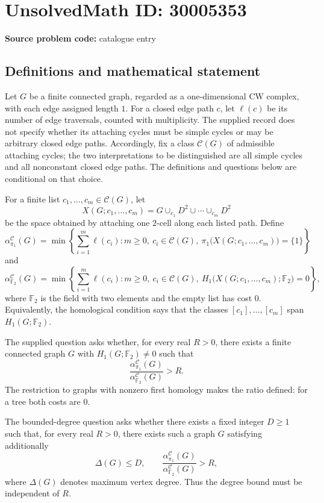 \documentclass[11pt]{article}
\begin{document}
\section*{UnsolvedMath ID: 30005353}
\textbf{Source problem code:} catalogue entry
\subsection{Definitions and mathematical statement}
Let \(G\) be a finite connected graph, regarded as a one-dimensional CW complex, with each edge assigned length \(1\). For a closed edge path \(c\), let \(\ell(c)\) be its number of edge traversals, counted with multiplicity. The supplied record does not specify whether its attaching cycles must be simple cycles or may be arbitrary closed edge paths. Accordingly, fix a class \(\mathcal C(G)\) of admissible attaching cycles; the two interpretations to be distinguished are all simple cycles and all nonconstant closed edge paths. The definitions and questions below are conditional on that choice.

For a finite list \(c_1,\ldots,c_m\in\mathcal C(G)\), let
\[
X(G;c_1,\ldots,c_m)=G\cup_{c_1}D^2\cup\cdots\cup_{c_m}D^2
\]
be the space obtained by attaching one \(2\)-cell along each listed path. Define
\[
\alpha_{\pi_1}^{\mathcal C}(G)=\min\left\{\sum_{i=1}^{m}\ell(c_i):m\geq 0,\ c_i\in\mathcal C(G),\ \pi_1\bigl(X(G;c_1,\ldots,c_m)\bigr)=\{1\}\right\}
\]
and
\[
\alpha_{\mathbb F_2}^{\mathcal C}(G)=\min\left\{\sum_{i=1}^{m}\ell(c_i):m\geq 0,\ c_i\in\mathcal C(G),\ H_1\bigl(X(G;c_1,\ldots,c_m);\mathbb F_2\bigr)=0\right\},
\]
where \(\mathbb F_2\) is the field with two elements and the empty list has cost \(0\). Equivalently, the homological condition says that the classes \([c_1],\ldots,[c_m]\) span \(H_1(G;\mathbb F_2)\).

The supplied question asks whether, for every real \(R>0\), there exists a finite connected graph \(G\) with \(H_1(G;\mathbb F_2)\neq 0\) such that
\[
\frac{\alpha_{\pi_1}^{\mathcal C}(G)}{\alpha_{\mathbb F_2}^{\mathcal C}(G)}>R.
\]
The restriction to graphs with nonzero first homology makes the ratio defined: for a tree both costs are \(0\).

The bounded-degree question asks whether there exists a fixed integer \(D\geq 1\) such that, for every real \(R>0\), there exists such a graph \(G\) satisfying additionally
\[
\Delta(G)\leq D,
\qquad
\frac{\alpha_{\pi_1}^{\mathcal C}(G)}{\alpha_{\mathbb F_2}^{\mathcal C}(G)}>R,
\]
where \(\Delta(G)\) denotes maximum vertex degree. Thus the degree bound must be independent of \(R\).
\end{document}
